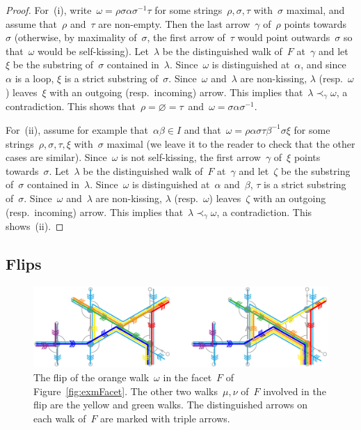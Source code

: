 \documentclass{amsart}
\theoremstyle{definition}
\newcommand{\fref}[1]{Figure~\ref{#1}} %
\begin{document}
\begin{proof}
For~(i), write~$\omega = \rho \sigma \alpha \sigma^{-1} \tau$ for some strings~$\rho, \sigma, \tau$ with~$\sigma$ maximal, and assume that~$\rho$ and~$\tau$ are non-empty.
Then the last arrow~$\gamma$ of~$\rho$ points towards~$\sigma$ (otherwise, by maximality of~$\sigma$, the first arrow of~$\tau$ would point outwards~$\sigma$ so that~$\omega$ would be self-kissing).
Let~$\lambda$ be the distinguished walk of~$F$ at~$\gamma$ and let~$\xi$ be the substring of~$\sigma$ contained in~$\lambda$.
Since~$\omega$ is distinguished at~$\alpha$, and since~$\alpha$ is a loop, $\xi$ is a strict substring of~$\sigma$.
Since~$\omega$ and~$\lambda$ are non-kissing, $\lambda$ (resp.~$\omega$) leaves~$\xi$ with an outgoing (resp.~incoming) arrow.
This implies that~$\lambda \prec_\gamma \omega$, a contradiction.
This shows that~$\rho = \varnothing = \tau$~and~$\omega = \sigma \alpha \sigma^{-1}$.

For~(ii), assume for example that~$\alpha\beta \in I$ and that~$\omega = \rho \alpha \sigma \tau \beta^{-1} \sigma \xi$ for some strings~$\rho, \sigma, \tau, \xi$ with~$\sigma$ maximal (we leave it to the reader to check that the other cases are similar).
Since~$\omega$ is not self-kissing, the first arrow~$\gamma$ of~$\xi$ points towards~$\sigma$.
Let~$\lambda$ be the distinguished walk of~$F$ at~$\gamma$ and let~$\zeta$ be the substring of~$\sigma$ contained in~$\lambda$.
Since~$\omega$ is distinguished at~$\alpha$ and~$\beta$, $\tau$ is a strict substring of~$\sigma$.
Since~$\omega$ and~$\lambda$ are non-kissing, $\lambda$ (resp.~$\omega$) leaves~$\zeta$ with an outgoing (resp.~incoming) arrow.
This implies that~$\lambda \prec_\gamma \omega$, a contradiction.
This shows~(ii).
\end{proof}

\subsection{Flips}
\label{subsec:flips}

\begin{figure}[t]
	\capstart
	\centerline{\includegraphics[scale=.7]{exmFlip}}
	\caption{The flip of the orange walk~$\omega$ in the facet~$F$ of \fref{fig:exmFacet}. The other two walks~$\mu, \nu$ of~$F$ involved in the flip are the yellow and green walks. The distinguished arrows on each walk of~$F$ are marked with triple arrows.}
	\label{fig:exmFlip}
\end{figure}
\end{document}
